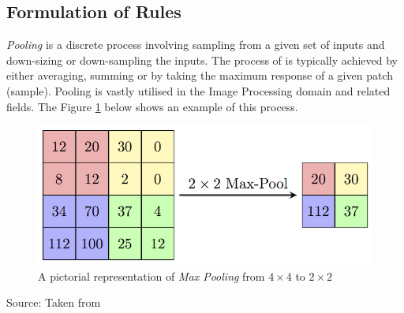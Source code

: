 \subsection{Formulation of Rules}
\textit{Pooling} is a discrete process involving sampling from a given set of inputs and down-sizing or down-sampling the inputs. The process of is typically achieved by either averaging, summing or by taking the maximum response of a given patch (sample)\cite{cnn,pool,murr}. Pooling is vastly utilised in the Image Processing domain and related fields. The Figure \ref{fig:pool} below shows an example of this process.
\begin{figure}[H]
\centering
\includegraphics[width=1\textwidth]{Figures/Chapter3/pool}
\caption{A pictorial representation of \textit{Max Pooling} from $4 \times 4$ to $2 \times 2$}
\label{fig:pool}
\end{figure}
\begin{center}
Source: Taken from \cite{pool}
\end{center}

